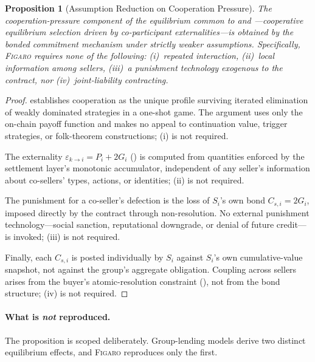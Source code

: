 \documentclass[11pt,a4paper]{article}
\newtheorem{proposition}[theorem]{Proposition}
\theoremstyle{definition}
\theoremstyle{remark}
\newcommand{\figaro}{\textsc{Figaro}}
\newcommand{\pay}{P}           %
\newcommand{\cumval}{G}        %
\begin{document}
\begin{proposition}[Assumption Reduction on Cooperation Pressure]
\label{prop:microfinance-reduction}
The \emph{cooperation-pressure component} of the equilibrium common
to \citet{ghatak1999} and \citet{stiglitz1990}---cooperative
equilibrium selection driven by co-participant externalities---is
obtained by the bonded commitment mechanism under strictly weaker
assumptions. Specifically, \figaro{} requires none of the following:
(i)~repeated interaction,
(ii)~local information among sellers,
(iii)~a punishment technology exogenous to the contract, nor
(iv)~joint-liability contracting.
\end{proposition}

\begin{proof}
 establishes cooperation as the unique profile
surviving iterated elimination of weakly dominated strategies in a
one-shot game. The argument uses only the on-chain payoff function and
makes no appeal to continuation value, trigger strategies, or
folk-theorem constructions; (i) is not required.

The externality $\varepsilon_{k \to i} = \pay_i + 2\cumval_i$
() is computed from quantities
enforced by the settlement layer's monotonic accumulator, independent
of any seller's information about co-sellers' types, actions, or
identities; (ii) is not required.

The punishment for a co-seller's defection is the loss of $S_i$'s own
bond $C_{s,i} = 2\cumval_i$, imposed directly by the contract through
non-resolution. No external punishment technology---social sanction,
reputational downgrade, or denial of future credit---is invoked;
(iii) is not required.

Finally, each $C_{s,i}$ is posted individually by $S_i$ against
$S_i$'s own cumulative-value snapshot, not against the group's
aggregate obligation. Coupling across sellers arises from the buyer's
atomic-resolution constraint (), not from
the bond structure; (iv) is not required.
\end{proof}

\paragraph{What is \emph{not} reproduced.}
The proposition is scoped deliberately. Group-lending models
derive two distinct equilibrium effects, and \figaro{} reproduces
only the first.
\end{document}
